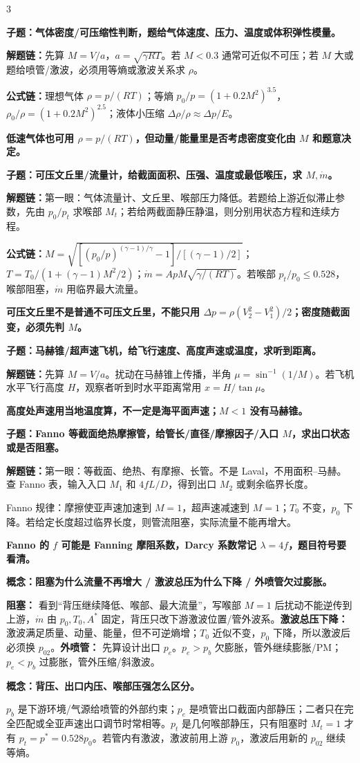 \documentclass[a4paper]{article}
\newcommand{\qt}[1]{\vspace{0.04pt}\colorbox{Q}{\parbox{\dimexpr\linewidth-2\fboxsep}{\color{white}\bfseries #1}}\par}
\newcommand{\ans}[1]{\colorbox{G}{\parbox{\dimexpr\linewidth-2\fboxsep}{#1}}\par}
\newcommand{\warn}[1]{\colorbox{Y}{\parbox{\dimexpr\linewidth-2\fboxsep}{\color{E}\bfseries #1}}\par}
\newcommand{\chain}[1]{{\color{A}\bfseries 解题链：}#1\par}
\newcommand{\form}[1]{{\color{M}\bfseries 公式链：}#1\par}
\begin{document}
\begin{multicols}{3}
\qt{子题：气体密度/可压缩性判断，题给气体速度、压力、温度或体积弹性模量。}
\chain{先算 $M=V/a$，$a=\sqrt{\gamma RT}$。若 $M<0.3$ 通常可近似不可压；若 $M$ 大或题给喷管/激波，必须用等熵或激波关系求 $\rho$。}
\form{理想气体 $\rho=p/(RT)$；等熵 $p_0/p=(1+0.2M^2)^{3.5}$，$\rho_0/\rho=(1+0.2M^2)^{2.5}$；液体小压缩 $\Delta\rho/\rho\approx\Delta p/E$。}
\warn{低速气体也可用 $\rho=p/(RT)$，但动量/能量里是否考虑密度变化由 $M$ 和题意决定。}

\qt{子题：可压文丘里/流量计，给截面面积、压强、温度或最低喉压，求 $M,\dot m$。}
\chain{第一眼：气体流量计、文丘里、喉部压力降低。若题给上游近似滞止参数，先由 $p_0/p_t$ 求喉部 $M_t$；若给两截面静压静温，则分别用状态方程和连续方程。}
\form{$M=\sqrt{[(p_0/p)^{(\gamma-1)/\gamma}-1]/[(\gamma-1)/2]}$；$T=T_0/(1+(\gamma-1)M^2/2)$；$\dot m=ApM\sqrt{\gamma/(RT)}$。若喉部 $p_t/p_0\le0.528$，喉部阻塞，$\dot m$ 用临界最大流量。}
\warn{可压文丘里不是普通不可压文丘里，不能只用 $\Delta p=\rho(V_2^2-V_1^2)/2$；密度随截面变，必须先判 $M$。}

\qt{子题：马赫锥/超声速飞机，给飞行速度、高度声速或温度，求听到距离。}
\chain{先算 $M=V/a$。扰动在马赫锥上传播，半角 $\mu=\sin^{-1}(1/M)$。若飞机水平飞行高度 $H$，观察者听到时水平距离常用 $x=H/\tan\mu$。}
\warn{高度处声速用当地温度算，不一定是海平面声速；$M<1$ 没有马赫锥。}

\qt{子题：Fanno 等截面绝热摩擦管，给管长/直径/摩擦因子/入口 $M$，求出口状态或是否阻塞。}
\chain{第一眼：等截面、绝热、有摩擦、长管。不是 Laval，不用面积--马赫。查 Fanno 表，输入入口 $M_1$ 和 $4fL/D$，得到出口 $M_2$ 或剩余临界长度。}
\ans{Fanno 规律：摩擦使亚声速加速到 $M=1$，超声速减速到 $M=1$；$T_0$ 不变，$p_0$ 下降。若给定长度超过临界长度，则管流阻塞，实际流量不能再增大。}
\warn{Fanno 的 $f$ 可能是 Fanning 摩阻系数，Darcy 系数常记 $\lambda=4f$，题目符号要看清。}

\qt{概念：阻塞为什么流量不再增大 / 激波总压为什么下降 / 外喷管欠过膨胀。}
\ans{\textbf{阻塞：} 看到“背压继续降低、喉部、最大流量”，写喉部 $M=1$ 后扰动不能逆传到上游，$\dot m$ 由 $p_0,T_0,A^*$ 固定，背压只改下游激波位置/管外波系。\textbf{激波总压下降：} 激波满足质量、动量、能量，但不可逆熵增；$T_0$ 近似不变，$p_0$ 下降，所以激波后必须换 $p_{02}$。\textbf{外喷管：} 先算设计出口 $p_e$。$p_e>p_b$ 欠膨胀，管外继续膨胀/PM；$p_e<p_b$ 过膨胀，管外压缩/斜激波。}
\qt{概念：背压、出口内压、喉部压强怎么区分。}
\ans{$p_b$ 是下游环境/气源给喷管的外部约束；$p_e$ 是喷管出口截面内部静压；二者只在完全匹配或全亚声速出口调节时常相等。$p_t$ 是几何喉部静压，只有阻塞时 $M_t=1$ 才有 $p_t=p^*=0.528p_0$。若管内有激波，激波前用上游 $p_0$，激波后用新的 $p_{02}$ 继续等熵。}


\end{multicols}
\end{document}
